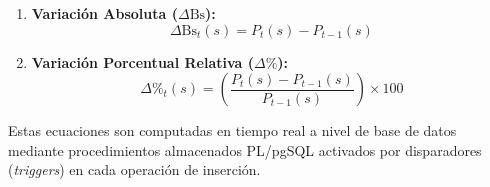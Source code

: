 \begin{enumerate}[leftmargin=*]
    \item \textbf{Variación Absoluta ($\Delta\text{Bs}$):}
    \begin{equation}
        \Delta\text{Bs}_t(s) = P_t(s) - P_{t-1}(s)
        \label{eq:delta_bs}
    \end{equation}
    \item \textbf{Variación Porcentual Relativa ($\Delta\%$):}
    \begin{equation}
        \Delta\%_t(s) = \left( \frac{P_t(s) - P_{t-1}(s)}{P_{t-1}(s)} \right) \times 100
        \label{eq:delta_pct}
    \end{equation}
\end{enumerate}

Estas ecuaciones son computadas en tiempo real a nivel de base de datos mediante procedimientos almacenados PL/pgSQL activados por disparadores (\textit{triggers}) en cada operación de inserción.

